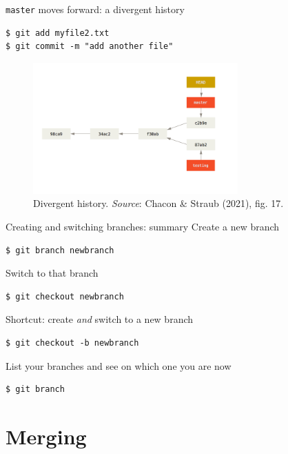\documentclass[handout]{beamer}
\begin{document}
\begin{frame}[fragile]{\texttt{master} moves forward: a divergent history}

\begin{lstlisting}
$ git add myfile2.txt
$ git commit -m "add another file"
\end{lstlisting}

\begin{figure}
	\includegraphics[width=0.7\textwidth]{figures/fig17_diverge.png}
	\caption{Divergent history. \textit{Source}: Chacon \& Straub (2021), fig. 17.}
\end{figure}
\end{frame}

\begin{frame}[fragile]{Creating and switching branches: summary}
Create a new branch
\begin{lstlisting}
$ git branch newbranch
\end{lstlisting}
Switch to that branch
\begin{lstlisting}
$ git checkout newbranch
\end{lstlisting}
Shortcut: create \textit{and} switch to a new branch 
\begin{lstlisting}
$ git checkout -b newbranch
\end{lstlisting}
List your branches and see on which one you are now
\begin{lstlisting}
$ git branch
\end{lstlisting}
\end{frame}

\section{Merging}
\end{document}
